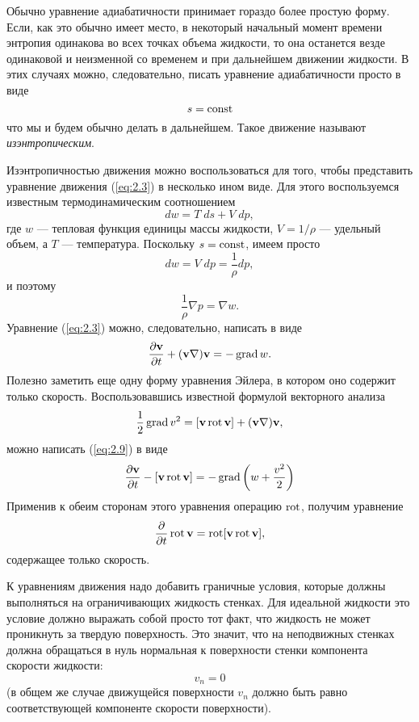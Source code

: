 Обычно уравнение адиабатичности принимает гораздо более простую форму. Если, как
это обычно имеет место, в некоторый начальный момент времени энтропия одинакова
во всех точках объема жидкости, то она останется везде одинаковой и неизменной
со временем и при дальнейшем движении жидкости. В этих случаях можно,
следовательно, писать уравнение адиабатичности просто в виде
\begin{equation}
   \label{eq:2.8}
     s = \mathop{\mathrm{const}}\nolimits
\end{equation}
что мы и будем обычно делать в дальнейшем. Такое движение называют
\textit{изэнтропическим}.

Изэнтропичностью движения можно воспользоваться для того, чтобы представить
уравнение движения (\ref{eq:2.3}) в несколько ином виде. Для этого воспользуемся
известным термодинамическим соотношением
\[
   dw = T\;ds + V\; dp,
\]
где $w$ — тепловая функция единицы массы жидкости, $V=1/\rho$ — удельный объем,
а $T$ — температура. Поскольку $s=\mathop{\mathrm{const}}\nolimits$, имеем просто
\[
   dw = V\; dp = \frac1{\rho} dp,
\]
и поэтому
\[
   \frac1 \rho \nabla p = \nabla w.
\]
Уравнение (\ref{eq:2.3}) можно, следовательно, написать в виде
\begin{equation}
   \label{eq:2.9}
   \frac{\partial { \mathbf{v} }}{\partial t} + ({\mathbf{v}} \nabla) {\mathbf{v}} = - \mathop{\mathrm{grad}}\nolimits w.
\end{equation}
Полезно заметить еще одну форму уравнения Эйлера, в котором оно содержит только
скорость. Воспользовавшись известной формулой векторного анализа
\[
   \frac{1}{2}\mathop{\mathrm{grad}}\nolimits v^2 = \lbrack { \mathbf{v} } \mathop{\mathrm{rot}}\nolimits { \mathbf{v} } \rbrack + ({\mathbf{v}} \nabla) {\mathbf{v}},
\]
можно написать (\ref{eq:2.9}) в виде
\begin{equation}
   \label{eq:2.10}
   \frac{\partial { \mathbf{v} }}{\partial t} - \lbrack { \mathbf{v} } \mathop{\mathrm{rot}}\nolimits { \mathbf{v} } \rbrack = -\mathop{\mathrm{grad}}\nolimits \left( w + \frac{v^2}{2} \right)
\end{equation}
Применив к обеим сторонам этого уравнения операцию $\mathop{\mathrm{rot}}\nolimits$, получим уравнение
\begin{equation}
   \label{eq:2.11}
   \frac{\partial}{\partial t} \mathop{\mathrm{rot}}\nolimits { \mathbf{v} } = \mathop{\mathrm{rot}}\nolimits \lbrack { \mathbf{v} } \mathop{\mathrm{rot}}\nolimits { \mathbf{v} } \rbrack,
\end{equation}
содержащее только скорость.

К уравнениям движения надо добавить граничные условия, которые должны
выполняться на ограничивающих жидкость стенках. Для идеальной жидкости это
условие должно выражать собой просто тот факт, что жидкость не может проникнуть
за твердую поверхность. Это значит, что на неподвижных стенках должна обращаться
в нуль нормальная к поверхности стенки компонента скорости жидкости:
\begin{equation}
   \label{eq:2.12}
   v_n = 0
\end{equation}
(в общем же случае движущейся поверхности $v_n$ должно быть равно
соответствующей компоненте скорости поверхности).

